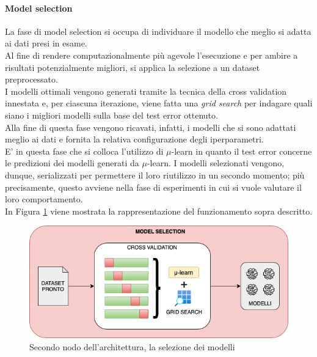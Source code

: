 \documentclass[12pt]{report}
\theoremstyle{definition}
\begin{document}
\paragraph{Model selection}
La fase di model selection si occupa di individuare il modello che meglio si adatta ai dati presi in esame.
\\
Al fine di rendere computazionalmente più agevole l'esecuzione e per ambire a risultati potenzialmente migliori, si applica la selezione a un dataset preprocessato.
\\
I modelli ottimali vengono generati tramite la tecnica della cross validation innestata e, per ciascuna iterazione, viene fatta una \textit{grid search} per indagare quali siano i migliori modelli sulla base del test error ottenuto.
\\
Alla fine di questa fase vengono ricavati, infatti, i modelli che si sono adattati meglio ai dati e fornita la relativa configurazione degli iperparametri.
\\
E' in questa fase che si colloca l'utilizzo di $\mu$-learn in quanto il test error concerne le predizioni dei modelli generati da $\mu$-learn.
I modelli selezionati vengono, dunque, serializzati per permettere il loro riutilizzo in un secondo momento; più precisamente, questo avviene nella fase di esperimenti in cui si vuole valutare il loro comportamento.
\\
In Figura \ref{selectionmodel} viene mostrata la rappresentazione del funzionamento sopra descritto.
\begin{figure}
    \centering
    \includegraphics[scale=0.6]{images/modelselectionmodule.png}
    \caption{Secondo nodo dell'architettura, la selezione dei modelli}
    \label{selectionmodel}
\end{figure}
\end{document}

